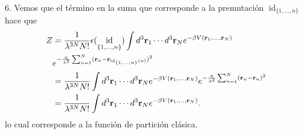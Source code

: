 \documentclass{article}
\DeclareMathOperator{\id}{id}
\begin{document}
6. Vemos que el término en la suma que corresponde a la premutación $\id_{\{1,\dots,n\}}$ hace que
\begin{align}
\begin{split}
Z&=\frac{1}{\lambda^{3N}N!}\epsilon(\id_{\{1,\dots,n\}})\int d^3\vb{r}_1\cdots d^3\vb{r}_N e^{-\beta V(\vb{r}_1,\dots,\vb{r}_N)}\\
&e^{-\frac{\pi}{\lambda^2}\sum_{n=1}^N(\vb{r}_n-\vb{r}_{\id_{\{1,\dots,n\}}(n)})^2}\\
&=\frac{1}{\lambda^{3N}N!}\int d^3\vb{r}_1\cdots d^3\vb{r}_N e^{-\beta V(\vb{r}_1,\dots,\vb{r}_N)}e^{-\frac{\pi}{\lambda^2}\sum_{n=1}^N(\vb{r}_n-\vb{r}_n)^2}\\
&=\frac{1}{\lambda^{3N}N!}\int d^3\vb{r}_1\cdots d^3\vb{r}_N e^{-\beta V(\vb{r}_1,\dots,\vb{r}_N)}.
\end{split}
\end{align}
lo cual corresponde a la función de partición clásica.
\end{document}
